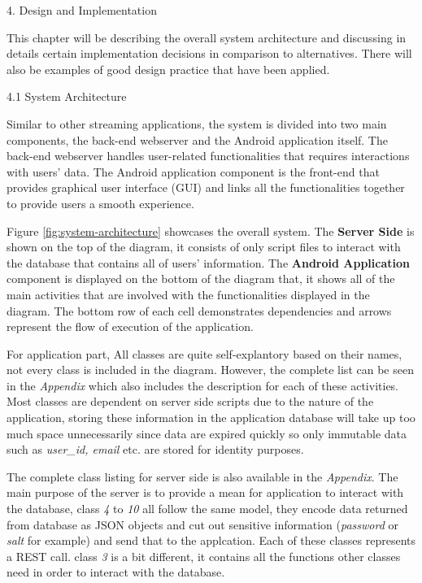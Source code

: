 \documentclass{article}
\begin{document}
\begin{flushleft}
\newpage
{\huge 4. Design and Implementation}\par
This chapter will be describing the overall system architecture and discussing in details certain implementation decisions in comparison to alternatives. There will also be examples of good design practice that have been applied.\par
{\Large 4.1 System Architecture}\par
Similar to other streaming applications, the system is divided into two main components, the back-end webserver and the Android application itself. The back-end webserver handles user-related functionalities that requires interactions with users' data. The Android application component is the front-end that provides graphical user interface (GUI) and links all the functionalities together to provide users a smooth experience.\par
Figure \ref{fig:system-architecture} showcases the overall system. The \textbf{Server Side} is shown on the top of the diagram, it consists of only script files to interact with the database that contains all of users' information. The \textbf{Android Application} component is displayed on the bottom of the diagram that, it shows all of the main activities that are involved with the functionalities displayed in the diagram. The bottom row of each cell demonstrates dependencies and arrows represent the flow of execution of the application.\par
For application part, All classes are quite self-explantory based on their names, not every class is included in the diagram. However, the complete list can be seen in the \textit{Appendix} which also includes the description for each of these activities. Most classes are dependent on server side scripts due to the nature of the application, storing these information in the application database will take up too much space unnecessarily since data are expired quickly so only immutable data such as \textit{user\_id, email} etc. are stored for identity purposes. \par
The complete class listing for server side is also available in the \textit{Appendix}. The main purpose of the server is to provide a mean for application to interact with the database, class \textit{4} to \textit{10} all follow the same model, they encode data returned from database as JSON objects and cut out sensitive information (\textit{password} or \textit{salt} for example) and send that to the applcation. Each of these classes represents a REST call. class \textit{3} is a bit different, it contains all the functions other classes need in order to interact with the database.\par

\end{flushleft}
\end{document}
